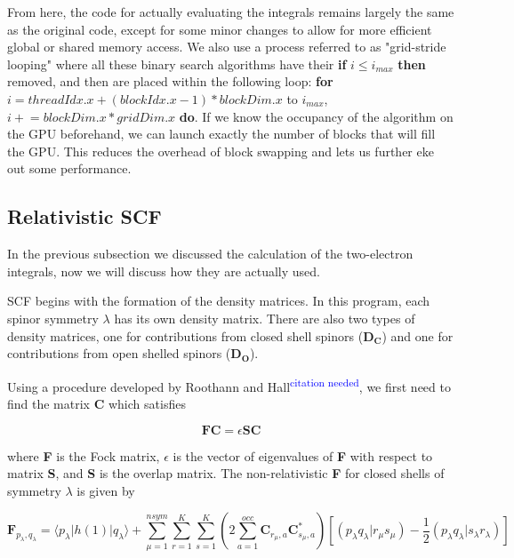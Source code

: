 \documentclass[12pt]{report}
\newcommand{\citethis}{\textsuperscript{\textcolor{blue}{citation needed}}} %
\begin{document}
From here, the code for actually evaluating the integrals remains largely the same as the original code, except for some minor changes to allow for more efficient global or shared memory access. We also use a process referred to as "grid-stride looping" where all these binary search algorithms have their \textbf{if} $i \le i_{max}$ \textbf{then} removed, and then are placed within the following loop: \textbf{for} $i = threadIdx.x + (blockIdx.x - 1) * blockDim.x$ to $i_{max}$, $i \mathrel{+}= blockDim.x * gridDim.x$ \textbf{do}. If we know the occupancy of the algorithm on the GPU beforehand, we can launch exactly the number of blocks that will fill the GPU. This reduces the overhead of block swapping and lets us further eke out some performance.

\subsection{Relativistic SCF}

In the previous subsection we discussed the calculation of the two-electron integrals, now we will discuss how they are actually used. 

SCF begins with the formation of the density matrices. In this program, each spinor symmetry $\lambda$ has its own density matrix. There are also two types of density matrices, one for contributions from closed shell spinors (\textbf{D$_\textbf{C}$}) and one for contributions from open shelled spinors (\textbf{D$_\textbf{O}$}).

Using a procedure developed by Roothann and Hall\citethis{}, we first need to find the matrix \textbf{C} which satisfies 

\begin{equation}
\label{RHE}
\textbf{FC} = \epsilon{}\textbf{SC}
\end{equation}

where \textbf{F} is the Fock matrix, $\epsilon$ is the vector of eigenvalues of \textbf{F} with respect to matrix \textbf{S}, and \textbf{S} is the overlap matrix. The non-relativistic \textbf{F} for closed shells of symmetry $\lambda$ is given by

\begin{equation}
\label{FOCKM}
\textbf{F}_{p_{\lambda},q_{\lambda}} = \langle p_{\lambda}|h(1)|q_{\lambda}\rangle + \sum^{nsym}_{\mu=1}\sum^{K}_{r=1}\sum^{K}_{s=1}\left( 2\sum^{occ}_{a=1}\textbf{C}_{r_{\mu},a}\textbf{C}^{*}_{s_{\mu}, a}\right)
				\left[\left( p_{\lambda}q_{\lambda}|r_{\mu}s_{\mu}\right) - \frac{1}{2}\left( p_{\lambda}q_{\lambda}|s_{\lambda}r_{\lambda}\right)\right]
\end{equation}
\end{document}
